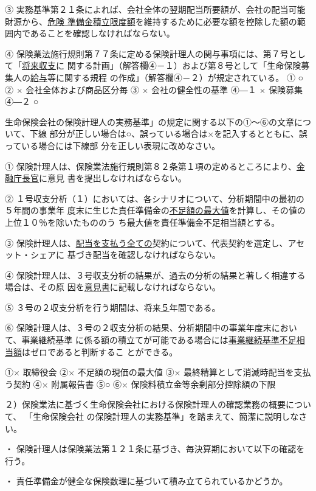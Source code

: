 \documentclass[report,gutter=10mm,fore-edge=10mm,uplatex,dvipdfmx]{jlreq}
\begin{document}
③ 実務基準第２１条によれば、会社全体の翌期配当所要額が、会社の配当可能財源から、\underline{危険
準備金積立限度額}を維持するために必要な額を控除した額の範囲内であることを確認しなければならない。

④ 保険業法施行規則第７７条に定める保険計理人の関与事項には、第７号として「\underline{将来収支}に
関する計画」（解答欄④－１）および第８号として「生命保険募集人の\underline{給与}等に関する規程
の作成」（解答欄④－２）が規定されている。
\answer{}
① ○ 
② × 会社全体および商品区分毎 
③ × 会社の健全性の基準 
④―１ × 保険募集 
④―２ ○ 

生命保険会社の保険計理人の実務基準」の規定に関する以下の①～⑥の文章について、下線
部分が正しい場合は○、誤っている場合は×を記入するとともに、誤っている場合には下線部
分を正しい表現に改めなさい。

① 保険計理人は、保険業法施行規則第８２条第１項の定めるところにより、\underline{金融庁長官}に意見
書を提出しなければならない。

② １号収支分析（１）においては、各シナリオについて、分析期間中の最初の５年間の事業年
度末に生じた責任準備金の\underline{不足額の最大値}を計算し、その値の上位１０％を除いたもののう
ち最大値を責任準備金不足相当額とする。

③ 保険計理人は、\underline{配当を支払う全ての}契約について、代表契約を選定し、アセット・シェアに
基づき配当を確認しなければならない。

④ 保険計理人は、３号収支分析の結果が、過去の分析の結果と著しく相違する場合は、その原
因を\underline{意見書}に記載しなければならない。

⑤ ３号の２収支分析を行う期間は、将来\underline{５}年間である。

⑥ 保険計理人は、３号の２収支分析の結果、分析期間中の事業年度末において、事業継続基準
に係る額の積立てが可能である場合には\underline{事業継続基準不足相当額}はゼロであると判断するこ
とができる。

\answer{}

①× 取締役会 
②× 不足額の現価の最大値 
③× 最終精算として消滅時配当を支払う契約 
④× 附属報告書 
⑤○
⑥× 保険料積立金等余剰部分控除額の下限  

２）保険業法に基づく生命保険会社における保険計理人の確認業務の概要について、
「生命保険会社
の保険計理人の実務基準」を踏まえて、簡潔に説明しなさい。

\answer{}

・ 保険計理人は保険業法第１２１条に基づき、毎決算期において以下の確認を行う。

・ 責任準備金が健全な保険数理に基づいて積み立てられているかどうか。
\end{document}
